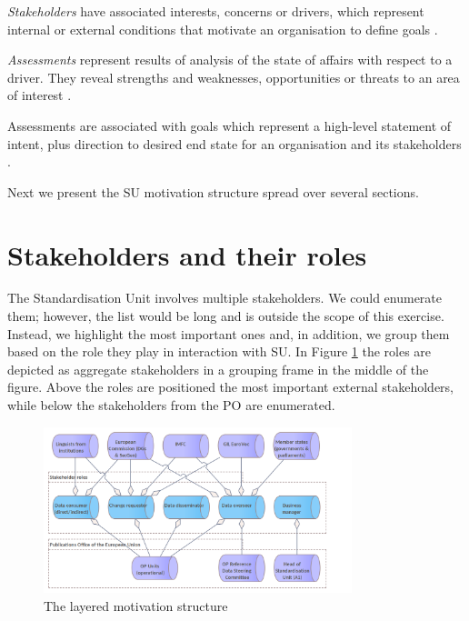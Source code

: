 	\textit{Stakeholders} have associated interests, concerns or drivers, which represent internal or external conditions that motivate an organisation to define goals \citep{archimate3.1}.
	
	
	 
	\textit{Assessments} represent results of analysis of the state of affairs with respect to a driver. They reveal strengths and weaknesses, opportunities or threats to an area of interest \citep{archimate3.1}.
	
	Assessments are associated with goals which represent a high-level statement of intent, plus direction to desired end state for an organisation and its stakeholders \citep{archimate3.1}. 
	
	Next we present the SU motivation structure spread over several sections.
	
	\section{Stakeholders and their roles}
	
	The Standardisation Unit involves multiple stakeholders. We could enumerate them; however, the list would  be long and is outside the scope of this exercise. Instead, we highlight the most important ones and, in addition, we group them based on the role they play in interaction with SU. In Figure \ref{fig:stakehodlers-roles} the roles are depicted as aggregate stakeholders in a grouping frame in the middle of the figure. Above the roles are positioned the most important external stakeholders, while below the stakeholders from the PO are enumerated.
	
	\begin{figure}[!h]
		\centering
		\includegraphics[width=0.8\textwidth]{images/motivation/Stakeholders & Roles.png}
		\caption{The layered motivation structure}
		\label{fig:stakehodlers-roles}
	\end{figure}
	
